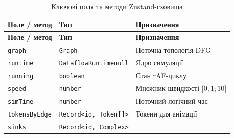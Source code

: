 \documentclass[
]{article}
\newcommand{\passthrough}[1]{#1}
\begin{document}
\begin{longtable}[]{@{}
  >{\raggedright\arraybackslash}p{}
  >{\raggedright\arraybackslash}p{}
  >{\raggedright\arraybackslash}p{}@{}}
\caption[Ключові поля та методи Zustand-сховища]{Ключові поля та методи
Zustand-сховища}\tabularnewline
\toprule\noalign{}
\begin{minipage}[b]{\linewidth}\raggedright
\textbf{Поле / метод}
\end{minipage} & \begin{minipage}[b]{\linewidth}\raggedright
\textbf{Тип}
\end{minipage} & \begin{minipage}[b]{\linewidth}\raggedright
\textbf{Призначення}
\end{minipage} \\
\midrule\noalign{}
\endfirsthead
\toprule\noalign{}
\begin{minipage}[b]{\linewidth}\raggedright
\textbf{Поле / метод}
\end{minipage} & \begin{minipage}[b]{\linewidth}\raggedright
\textbf{Тип}
\end{minipage} & \begin{minipage}[b]{\linewidth}\raggedright
\textbf{Призначення}
\end{minipage} \\
\midrule\noalign{}
\endhead
\bottomrule\noalign{}
\endlastfoot
\passthrough{\lstinline!graph!} & \passthrough{\lstinline!Graph!} &
Поточна топологія DFG \\
\passthrough{\lstinline!runtime!} &
\passthrough{\lstinline!DataflowRuntimenull!} & Ядро симуляції \\
\passthrough{\lstinline!running!} & \passthrough{\lstinline!boolean!} &
Стан rAF-циклу \\
\passthrough{\lstinline!speed!} & \passthrough{\lstinline!number!} &
Множник швидкості \(\lbrack 0,1;10\rbrack\) \\
\passthrough{\lstinline!simTime!} & \passthrough{\lstinline!number!} &
Поточний логічний час \\
\passthrough{\lstinline!tokensByEdge!} &
\passthrough{\lstinline!Record<id,!}\passthrough{\lstinline! !}\passthrough{\lstinline!Token[]>!}
& Токени для анімації \\
\passthrough{\lstinline!sinks!} &
\passthrough{\lstinline!Record<id,!}\passthrough{\lstinline! !}\passthrough{\lstinline!Complex>!}

\end{longtable}
\end{document}

